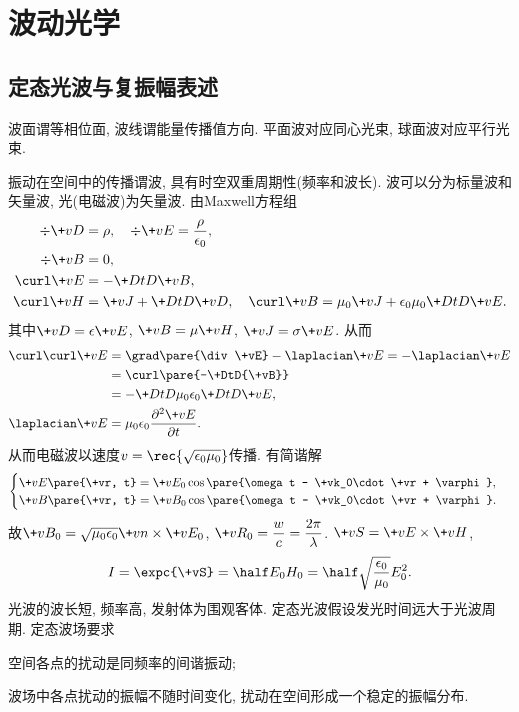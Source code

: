 \documentclass{ctexart}
\begin{document}
\headerstamp

\section{波动光学} %
\label{sec:波动光学}

\subsection{定态光波与复振幅表述} %
\label{sub:定态光波与复振幅表述}

波面谓等相位面, 波线谓能量传播值方向. 平面波对应同心光束, 球面波对应平行光束.
\par
振动在空间中的传播谓波, 具有时空双重周期性(频率和波长). 波可以分为标量波和矢量波, 光(电磁波)为矢量波. 由Maxwell方程组
\begin{align*}
    \div\+vD &= \rho,\quad \div\+vE = \frac{\rho}{\epsilon_0},\\
    \div\+vB &= 0,\quad \\
    \curl\+vE &= -\+DtD{\+vB},\quad \\
    \curl\+vH &= \+vJ + \+DtD{\+vD},\quad \curl\+vB =\mu_0 \+vJ + \epsilon_0\mu_0 \+DtD{\+vE}.
\end{align*}
其中$\+vD = \epsilon\+vE$, $\+vB = \mu \+vH$, $\+vJ = \sigma\+vE$. 从而
\begin{align*}
    \curl\curl\+vE &= \grad\pare{\div\+vE} - \laplacian \+vE = -\laplacian \+vE \\
    &= \curl\pare{-\+DtD{\+vB}}\\
    &= -\+DtD{}\mu_0\epsilon_0 \+DtD{\+vE},\\
    \laplacian \+vE &= \mu_0\epsilon_0 \frac{\partial^2 \+vE}{\partial t}.
\end{align*}
从而电磁波以速度$v = \displaystyle\rec{\sqrt{\epsilon_0 \mu_0}}$传播. 有简谐解
\[ \begin{cases}
    \+vE\pare{\+vr, t} = \+vE_0 \cos\pare{\omega t - \+vk_0\cdot\+vr + \varphi},\\
    \+vB\pare{\+vr, t} = \+vB_0 \cos\pare{\omega t - \+vk_0\cdot\+vr + \varphi}.
\end{cases} \]
故$\+vB_0 = \sqrt{\mu_0\epsilon_0}\+vn\times\+vE_0$, $\displaystyle \+vR_0 = \frac{w}{c} = \frac{2\pi}{\lambda}$. $\+vS = \+vE\times\+vH$,
\[ I = \expc{\+vS} = \half E_0H_0 = \half \sqrt{\frac{\epsilon_0}{\mu_0}} E_0^2. \]
光波的波长短, 频率高, 发射体为围观客体. 定态光波假设发光时间远大于光波周期. 定态波场要求
\begin{cenum}
    \item 空间各点的扰动是同频率的间谐振动;
    \item 波场中各点扰动的振幅不随时间变化, 扰动在空间形成一个稳定的振幅分布.
\end{cenum}
\end{document}
